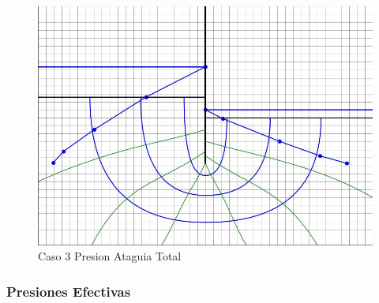 \begin{figure}[H]
\begin{minipage}{0.32\textwidth}
        \centering
        \includegraphics[width=\textwidth]{GRAFICOS/caso_3_presion_ataguia_total.jpg}
        \caption{Caso 3 Presion Ataguia Total}
        \label{fig:caso_3_presion_ataguia_total}
    \end{minipage}
\end{figure}

\subsubsection{Presiones Efectivas}

